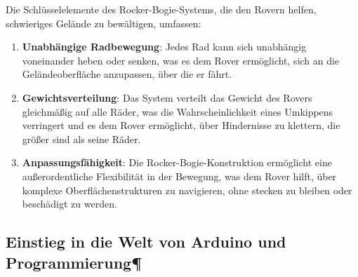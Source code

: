 \documentclass{vorlage-design-main}
\begin{document}
Die Schlüsselelemente des Rocker-Bogie-Systems, die den Rovern helfen,
schwieriges Gelände zu bewältigen, umfassen:

\begin{enumerate}
\def\labelenumi{\arabic{enumi}.}

\item
  \textbf{Unabhängige Radbewegung}: Jedes Rad kann sich unabhängig
  voneinander heben oder senken, was es dem Rover ermöglicht, sich an
  die Geländeoberfläche anzupassen, über die er fährt.
\item
  \textbf{Gewichtsverteilung}: Das System verteilt das Gewicht des
  Rovers gleichmäßig auf alle Räder, was die Wahrscheinlichkeit eines
  Umkippens verringert und es dem Rover ermöglicht, über Hindernisse zu
  klettern, die größer sind als seine Räder.
\item
  \textbf{Anpassungsfähigkeit}: Die Rocker-Bogie-Konstruktion ermöglicht
  eine außerordentliche Flexibilität in der Bewegung, was dem Rover
  hilft, über komplexe Oberflächenstrukturen zu navigieren, ohne stecken
  zu bleiben oder beschädigt zu werden.
\end{enumerate}

\hypertarget{einstieg-in-die-welt-von-arduino-und-programmierung}{%
\subsection{Einstieg in die Welt von Arduino und
Programmierung¶}\label{einstieg-in-die-welt-von-arduino-und-programmierung}}
\end{document}
